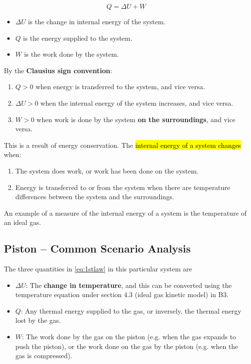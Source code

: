 \documentclass[a4paper,12pt]{article}
\begin{document}
\begin{law}
  \begin{equation}\label{eq:1stlaw}
    Q = \Delta U + W
  \end{equation}
  \begin{itemize}
    \item $\Delta U$ is the change in internal energy of the system.
    \item $Q$ is the energy supplied to the system.
    \item $W$ is the work done by the system.
  \end{itemize}
  By the \textbf{Clausius sign convention}:
  \begin{enumerate}
    \item $Q > 0$ when energy is transferred to the system, and vice versa.
    \item $\Delta U > 0$ when the internal energy of the system increases, and vice versa.
    \item $W > 0$ when work is done by the system \textbf{on the surroundings}, and vice versa.
  \end{enumerate}
\end{law}

This is a result of energy conservation. The \hl{internal energy of a system changes} when:
\begin{enumerate}
  \item The system does work, or work has been done on the system.
  \item Energy is transferred to or from the system when there are temperature differences between the system and the surroundings.
\end{enumerate}
An example of a measure of the internal energy of a system is the temperature of an ideal gas.

\pagebreak

\subsection{Piston -- Common Scenario Analysis}

The three quantities in \cref{eq:1stlaw} in this particular system are
\begin{itemize}
  \item $\Delta U$: The \textbf{change in temperature}, and this can be converted using the temperature equation under section 4.3 (ideal gas kinetic model) in B3.
  \item $Q$: Any thermal energy supplied to the gas, or inversely, the thermal energy lost by the gas.
  \item $W$: The work done by the gas on the piston (e.g. when the gas expands to push the piston), or the work done on the gas by the piston (e.g. when the gas is compressed).
\end{itemize}
\end{document}
